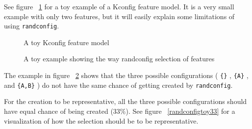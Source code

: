 \documentclass[a4paper,11pt]{report}
\newcommand{\textcode}[1]{
    \fboxsep=1pt
    \texttt{\colorbox{gray!20}{#1}}
}
\newcommand{\figa}{
    \begin{figure}[!htpb]
    \centering
}
\newcommand{\figb}[2]{
    \caption{#1}
    \label{#2}
    \end{figure}
}
\begin{document}
See figure ~\ref{randconfigtoy} for a toy example of a Kconfig feature model. 
It is a very small example with only two features, but it will easily explain 
some limitations of using \texttt{randconfig}.

\figa
    
\figb{A toy Kconfig feature model}{randconfigtoy}

\figa
\figb{A toy example showing the way randconfig selection of 
    features}{randconfigtoy50}

The example in figure ~\ref{randconfigtoy50} shows that the three possible 
configurations (\textcode{\{\}}, \textcode{\{A\}}, and \textcode{\{A,B\}}) do 
not have the same chance of getting created by \texttt{randconfig}.

For the creation to be representative, all the three possible configurations 
should have equal chance of being created (33\%). See figure 
~\ref{randconfigtoy33} for a visualization of how the selection should be to be 
representative.
\end{document}
